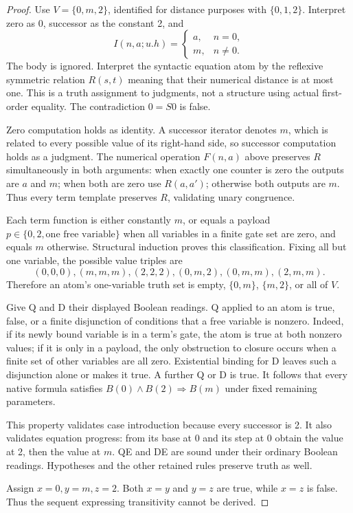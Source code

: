 \documentclass[11pt]{article}
\theoremstyle{definition}\newtheorem{definition}[theorem]{Definition}
\begin{document}
\begin{proof}
Use $V=\{0,m,2\}$, identified for distance purposes with
$\{0,1,2\}$. Interpret zero as 0, successor as the constant 2, and
\[
 I(n,a;u.h)=\begin{cases}a,&n=0,\\m,&n\ne0.\end{cases}
\]
The body is ignored. Interpret the syntactic equation atom by the
reflexive symmetric relation $R(s,t)$ meaning that their numerical
distance is at most one. This is a truth assignment to judgments,
not a structure using actual first-order equality. The contradiction
$0=S0$ is false.

Zero computation holds as identity. A successor iterator denotes
$m$, which is related to every possible value of its right-hand side,
so successor computation holds as a judgment. The numerical operation
$F(n,a)$ above preserves $R$ simultaneously in both arguments: when
exactly one counter is zero the outputs are $a$ and $m$; when both
are zero use $R(a,a')$; otherwise both outputs are $m$. Thus every
term template preserves $R$, validating unary congruence.

Each term function is either constantly $m$, or equals a payload
$p\in\{0,2,\text{one free variable}\}$ when all variables in a finite
gate set are zero, and equals $m$ otherwise. Structural induction proves
this classification. Fixing all but one variable, the possible value
triples are
\[
 (0,0,0),(m,m,m),(2,2,2),(0,m,2),(0,m,m),(2,m,m).
\]
Therefore an atom's one-variable truth set is empty, $\{0,m\}$,
$\{m,2\}$, or all of $V$.

Give Q and D their displayed Boolean readings. Q applied to an atom
is true, false, or a finite disjunction of conditions that a free
variable is nonzero. Indeed, if its newly bound variable is in a
term's gate, the atom is true at both nonzero values; if it is only
in a payload, the only obstruction to closure occurs when a finite
set of other variables are all zero. Existential binding for D leaves
such a disjunction alone or makes it true. A further Q or D is true.
It follows that every native formula satisfies
$B(0)\land B(2)\Rightarrow B(m)$ under fixed remaining parameters.

This property validates case introduction because every successor is
2. It also validates equation progress: from its base at 0 and its
step at 0 obtain the value at 2, then the value at $m$. QE and DE are
sound under their ordinary Boolean readings. Hypotheses and the other
retained rules preserve truth as well.

Assign $x=0,y=m,z=2$. Both $x=y$ and $y=z$ are true, while $x=z$
is false. Thus the sequent expressing transitivity cannot be derived.
\end{proof}
\end{document}
